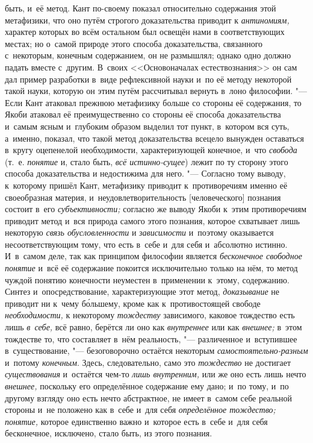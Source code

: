 быть, и~её метод. Кант по-своему показал относительно содержания этой
метафизики, что оно путём строгого доказательства приводит к
{\em антиномиям,}
характер которых во всём остальном был освещён нами в
соответствующих местах; но о~самой природе этого способа доказательства,
связанного с~некоторым, конечным содержанием, он не размышлял; однако одно
должно падать вместе с~другим. В~своих <<Основоначалах
естествознания>>
он сам дал пример разработки в~виде рефлексивной науки и~по
её методу некоторой такой науки, которую он этим путём рассчитывал вернуть
в~лоно философии. "--- Если Кант атаковал прежнюю метафизику
больше со стороны её содержания, то Якоби атаковал её преимущественно со
стороны её способа доказательства и~самым ясным и~глубоким образом выделил
тот пункт, в~котором вся суть, а~именно, показал, что такой метод
доказательства всецело вынужден оставаться в~кругу оцепенелой
необходимости, характеризующей конечное, и~что {\em свобода}
(т.~е. {\em понятие} и, стало быть, {\em всё истинно-сущее})
лежит по ту сторону этого способа доказательства и
недостижима для него. "--- Согласно тому выводу, к~которому
пришёл Кант, метафизику приводит к~противоречиям именно её своеобразная
материя, и~неудовлетворительность [человеческого] познания состоит в~его
{\em субъективности;} согласно же выводу Якоби к~этим противоречиям приводит
метод и~вся природа самого этого познания, которое схватывает лишь некоторую
{\em связь обусловленности} и {\em зависимости}
и~поэтому оказывается несоответствующим тому, что есть в~себе
и~для себя и~абсолютно истинно. И~в~самом деле, так как принципом философии
является {\em бесконечное свободное
понятие} и~всё её содержание покоится исключительно только
на нём, то метод чуждой понятию конечности неуместен в~применении к~этому,
содержанию. Синтез и~опосредствование, характеризующие этот метод,
{\em доказывание} не
приводит ни к~чему б\'{о}льшему, кроме как к~противостоящей свободе
{\em необходимости,} к
некоторому {\em тождеству}
зависимого, каковое тождество есть лишь
{\em в~себе,} всё равно,
берётся ли оно как {\em внутреннее}
или как {\em внешнее;}
в~этом тождестве то, что составляет в~нём реальность, "---
различенное и~вступившее в~существование, "---
безоговорочно остаётся некоторым
{\em самостоятельно-разным}
и~потому {\em конечным}.
Здесь, следовательно, само это
{\em тождество} не
достигает {\em существования}
и~остаётся чем-то
{\em лишь внутренним,}
или же оно есть лишь нечто
{\em внешнее,} поскольку
его определённое содержание ему дано; и~по тому, и~по другому взгляду оно
есть нечто абстрактное, не имеет в~самом себе реальной стороны и~не
положено как в~себе и~для себя
{\em определённое тождество;}
{\em понятие,} которое
единственно важно и~которое есть в~себе и~для себя бесконечное, исключено,
стало быть, из этого познания.

